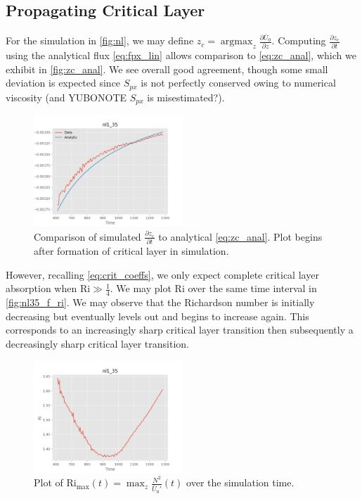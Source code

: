 \documentclass[twocolumn,
        nofootinbib, %
        usenames, %
        aps,
        prd,
        dvipsnames %
    ]{revtex4-1}%
\newcommand*{\pd}[2]{\frac{\partial#1}{\partial#2}}
\DeclareMathOperator*{\argmax}{argmax}
\begin{document}
\subsection{Propagating Critical Layer}

For the simulation in \autoref{fig:nl}, we may define $z_c = \argmax_z
\pd{\bar{U}_0}{z}$. Computing $\pd{z_c}{t}$ using the analytical flux
\autoref{eq:fpx_lin} allows comparison to \autoref{eq:zc_anal}, which we exhibit
in \autoref{fig:zc_anal}. We see overall good agreement, though some small
deviation is expected since $S_{px}$ is not perfectly conserved owing to
numerical viscosity (and YUBONOTE $S_{px}$ is misestimated?).
\begin{figure}[t]
    \centering
    \includegraphics[width=0.5\textwidth]{plots/nl35_front_v.png}
    \caption{Comparison of simulated $\pd{z_c}{t}$ to analytical
    \autoref{eq:zc_anal}. Plot begins after formation of critical layer in
    simulation.}\label{fig:zc_anal}
\end{figure}

However, recalling \autoref{eq:crit_coeffs}, we only expect complete critical
layer absorption when $\mathrm{Ri} \gg \frac{1}{4}$. We may plot $\mathrm{Ri}$
over the same time interval in \autoref{fig:nl35_f_ri}. We may observe that the
Richardson number is initially decreasing but eventually levels out and
begins to increase again. This corresponds to an increasingly sharp critical
layer transition then subsequently a decreasingly sharp critical layer
transition.
\begin{figure}[t]
    \centering
    \includegraphics[width=0.5\textwidth]{plots/nl35_f_ri.png}
    \caption{Plot of $\mathrm{Ri}_{\max}(t) = \max_z
    \frac{N^2}{\bar{U}_0'}(t)$ over the simulation time.}\label{fig:nl35_f_ri}
\end{figure}
\end{document}
